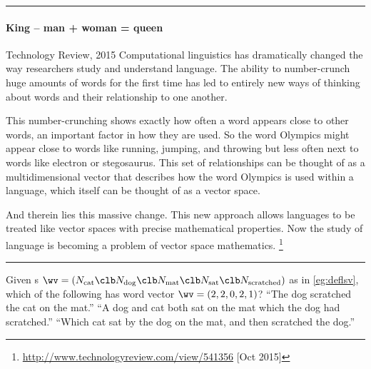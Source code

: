 \begin{table}
\hrule
\begin{minipage}{\linewidth}
\paragraph{King -- man + woman = queen}
\begin{quoted}{Technology Review, 2015}
Computational linguistics has dramatically changed the way researchers study and understand language. 
The ability to number-crunch huge amounts of words for the first time has led to entirely new ways of thinking about words and their relationship to one another.

This number-crunching shows exactly how often a word appears close to other words, an important factor in how they are used. 
So the word Olympics might appear close to words like running, jumping, and throwing but less often next to words like electron or stegosaurus.  
This set of relationships can be thought of as a multidimensional vector that describes how the word Olympics is used within a language, which itself can be thought of as a vector space.  

And therein lies this massive change. 
This new approach allows languages to be treated like vector spaces with precise mathematical properties. 
Now the study of language is becoming a problem of vector space mathematics.
\footnote{\url{http://www.technologyreview.com/view/541356} [Oct 2015]}
\end{quoted}
\end{minipage}
\hrule
\end{table}




\begin{activity}
Given s \(\wv=(N_{\text{cat}}\clb N_{\text{dog}}\clb N_{\text{mat}}\clb N_{\text{sat}}\clb N_{\text{scratched}})\) as in \cref{eg:deflsv},
which of the following has word vector \(\wv=(2,2,0,2,1)\)?
{``The dog scratched the cat on the mat.''}
{``A dog and cat both sat on the mat which the dog had scratched.''}
{``Which cat sat by the dog on the mat, and then scratched the dog.''}
\end{activity}








